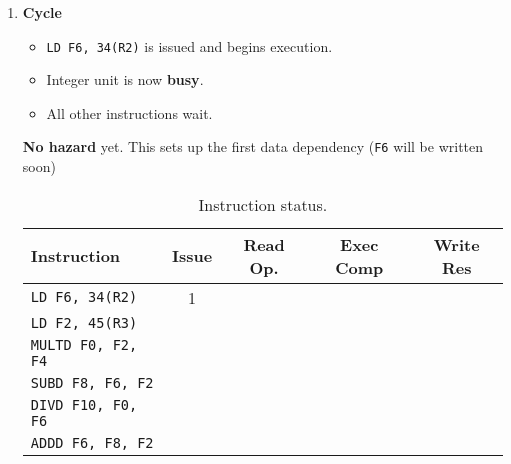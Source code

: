 \begin{enumerate}
    \item \textbf{Cycle \theenumi}
    \begin{itemize}
        \item \texttt{LD F6, 34(R2)} is issued and begins execution.
        \item Integer unit is now \textbf{busy}.
        \item All other instructions wait.
    \end{itemize}
    \textbf{No hazard} yet. This sets up the first data dependency (\texttt{F6} will be written soon)

    \begin{table}[!htp]
        \centering
        \begin{tabular}{@{} l | c c c c @{}}
            \toprule
            Instruction                 & Issue & Read Op.  & Exec Comp & Write Res \\
            \midrule
            \texttt{LD    F6, 34(R2)}   & 1     &           &           &           \\ [.3em]
            \texttt{LD    F2, 45(R3)}   &       &           &           &           \\ [.3em]
            \texttt{MULTD F0, F2, F4}   &       &           &           &           \\ [.3em]
            \texttt{SUBD  F8, F6, F2}   &       &           &           &           \\ [.3em]
            \texttt{DIVD  F10, F0, F6}  &       &           &           &           \\ [.3em]
            \texttt{ADDD  F6, F8, F2}   &       &           &           &           \\
            \bottomrule
        \end{tabular}
        \caption*{Instruction status.}
    \end{table}


\end{enumerate}
